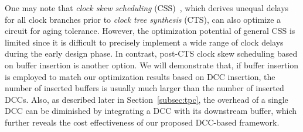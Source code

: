 
One may note that \textit{clock skew scheduling} (CSS)~\cite{fishburn1990clock}, which derives unequal delays for all clock branches prior to \textit{clock tree synthesis} (CTS), can also optimize a circuit for aging tolerance. However, the optimization potential of general CSS is limited since it is difficult to precisely implement a wide range of clock delays during the early design phase. In contrast, post-CTS clock skew scheduling based on buffer insertion is another option. We will demonstrate that, if buffer insertion is employed to match our optimization results based on DCC insertion, the number of inserted buffers is usually much larger than the number of inserted DCCs. Also, as described later in Section~\ref{subsec:tpc}, the overhead of a single DCC can be diminished by integrating a DCC with its downstream buffer, which further reveals the cost effectiveness of our proposed DCC-based framework.



